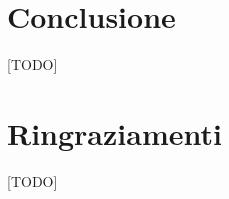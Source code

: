\documentclass[10pt, twoside, openany]{book}
\begin{document}
\chapter{Conclusione}
[TODO]



\chapter*{Ringraziamenti}
[TODO]




\end{document}
